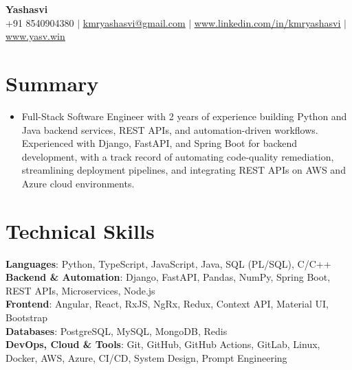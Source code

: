 \documentclass[letterpaper,11pt]{article}
\newcommand{\resumeItem}[1]{\item\small{{#1 \vspace{-2pt}}}}
\newcommand{\resumeSubHeadingListStart}{\begin{itemize}[leftmargin=0.0in, label={}]}
\newcommand{\resumeSubHeadingListEnd}{\end{itemize}}
\begin{document}
\begin{center}
    {\Huge\bfseries Yashasvi} \\ \vspace{4pt}
    \small
    +91 8540904380
    \hspace{0.2em}
    $|$
    \hspace{0.2em}
    \href{mailto:kmryashasvi@gmail.com}{\underline{kmryashasvi@gmail.com}}
    \hspace{0.2em}
    $|$
    \hspace{0.2em}
    \href{https://www.linkedin.com/in/kmryashasvi}{\underline{www.linkedin.com/in/kmryashasvi}}
    \hspace{0.2em}
    $|$
    \hspace{0.2em}
    \href{https://www.yasv.win}{\underline{www.yasv.win}}
\end{center}

\section{Summary}
\resumeSubHeadingListStart
\resumeItem{Full-Stack Software Engineer with 2 years of experience building Python and Java backend services, REST APIs, and automation-driven workflows. Experienced with Django, FastAPI, and Spring Boot for backend development, with a track record of automating code-quality remediation, streamlining deployment pipelines, and integrating REST APIs on AWS and Azure cloud environments.}
\resumeSubHeadingListEnd
\vspace{-15pt}

\section{Technical Skills}
\begin{itemize}[leftmargin=0.0in, label={}, itemsep=0pt, topsep=2pt]
\small{\item{
\textbf{Languages}{: Python, TypeScript, JavaScript, Java, SQL (PL/SQL), C/C++} \\
\textbf{Backend \& Automation}{: Django, FastAPI, Pandas, NumPy, Spring Boot, REST APIs, Microservices, Node.js} \\
\textbf{Frontend}{: Angular, React, RxJS, NgRx, Redux, Context API, Material UI, Bootstrap} \\
\textbf{Databases}{: PostgreSQL, MySQL, MongoDB, Redis} \\
\textbf{DevOps, Cloud \& Tools}{: Git, GitHub, GitHub Actions, GitLab, Linux, Docker, AWS, Azure, CI/CD, System Design, Prompt Engineering}
}}
\end{itemize}
\vspace{-11pt}
\end{document}
